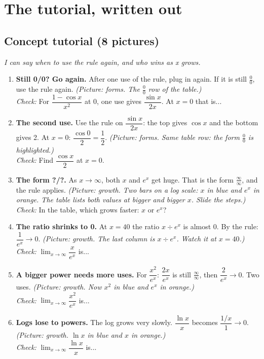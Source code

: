 \documentclass[11pt]{article}
\begin{document}
\section*{The tutorial, written out}
\subsection*{Concept tutorial (8 pictures)}
\textit{I can say when to use the rule again, and who wins as x grows.}\par
\begin{enumerate}
\item \textbf{Still 0/0? Go again.} After one use of the rule, plug in again. If it is still $\frac00$, use the rule again. \textit{(Picture: forms. The $\frac00$ row of the table.)}\\ \textit{Check:} For $\dfrac{1-\cos x}{x^2}$ at 0, one use gives $\dfrac{\sin x}{2x}$. At $x=0$ that is... 
\item \textbf{The second use.} Use the rule on $\dfrac{\sin x}{2x}$: the top gives $\cos x$ and the bottom gives 2. At $x=0$: $\dfrac{\cos0}{2}=\dfrac12$. \textit{(Picture: forms. Same table row: the form $\frac00$ is highlighted.)}\\ \textit{Check:} Find $\dfrac{\cos x}{2}$ at $x=0$. 
\item \textbf{The form ?/?.} As $x\to\infty$, both $x$ and $e^x$ get huge. That is the form $\frac{\infty}{\infty}$, and the rule applies. \textit{(Picture: growth. Two bars on a log scale: $x$ in blue and $e^x$ in orange. The table lists both values at bigger and bigger $x$. Slide the steps.)}\\ \textit{Check:} In the table, which grows faster: $x$ or $e^x$? 
\item \textbf{The ratio shrinks to 0.} At $x=40$ the ratio $x\div e^x$ is almost 0. By the rule: $\dfrac{1}{e^x}\to0$. \textit{(Picture: growth. The last column is $x\div e^x$. Watch it at $x=40$.)}\\ \textit{Check:} $\displaystyle\lim_{x\to\infty}\dfrac{x}{e^x}$ is... 
\item \textbf{A bigger power needs more uses.} For $\dfrac{x^2}{e^x}$: $\dfrac{2x}{e^x}$ is still $\frac{\infty}{\infty}$, then $\dfrac{2}{e^x}\to0$. Two uses. \textit{(Picture: growth. Now $x^2$ in blue and $e^x$ in orange.)}\\ \textit{Check:} $\displaystyle\lim_{x\to\infty}\dfrac{x^2}{e^x}$ is... 
\item \textbf{Logs lose to powers.} The log grows very slowly. $\dfrac{\ln x}{x}$ becomes $\dfrac{1/x}{1}\to0$. \textit{(Picture: growth. $\ln x$ in blue and $x$ in orange.)}\\ \textit{Check:} $\displaystyle\lim_{x\to\infty}\dfrac{\ln x}{x}$ is... 

\end{enumerate}
\end{document}
